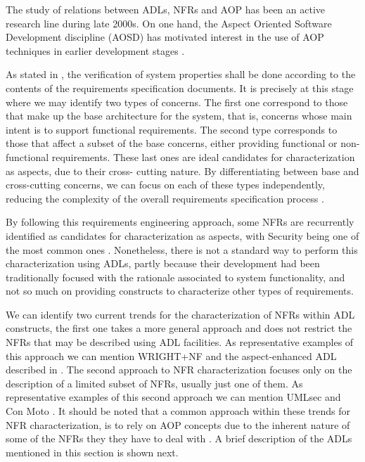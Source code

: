 \documentclass[10pt]{article}
\begin{document}
The study of relations between ADLs, NFRs and AOP has been an active research line during late 2000s. On one hand, the Aspect Oriented Software Development discipline (AOSD) has motivated interest in the use of AOP techniques in earlier development stages \cite{Chitchyan09}. 

As stated in \cite{Lozano10}, the verification of system properties shall be done according to the contents of the requirements specification documents. It is precisely at this stage where we may identify two types of concerns. The first one correspond to those that make up the base architecture for the system, that is, concerns whose main intent is to support functional requirements. The second type corresponds to those that affect a subset of the base concerns, either providing functional or non-functional requirements. These last ones are ideal candidates for characterization as aspects, due to their cross- cutting nature. By differentiating between base and cross-cutting concerns, we can focus on each of these types independently, reducing the complexity of the overall requirements specification process \cite{Lozano10}.

By following this requirements engineering approach, some NFRs are recurrently identified as candidates for characterization as aspects, with Security being one of the most common ones \cite{Baheri07} \cite{Zhang07}. Nonetheless, there is not a standard way to perform this characterization using ADLs, partly because their development had been traditionally focused with the rationale associated to system functionality, and not so much on providing constructs to characterize other types of requirements.

We can identify two current trends for the characterization of NFRs within ADL constructs, the first one takes a more general approach and does not restrict the NFRs that may be described using ADL facilities. As representative examples of this approach we can mention WRIGHT+NF \cite{Suleiman08} and the aspect-enhanced ADL described in \cite{Baheri07}. The second approach to NFR characterization focuses only on the description of a limited subset of NFRs, usually just one of them. As representative examples of this second approach we can mention UMLsec \cite{Jurgens02} and Con Moto \cite{Gruhn04}. It should be noted that a common approach within these trends for NFR characterization, is to rely on AOP concepts due to the inherent nature of some of the NFRs they they have to deal with \cite{Baheri07}\cite{Zhang07}. A brief description of the ADLs mentioned in this section is shown next.
\end{document}
